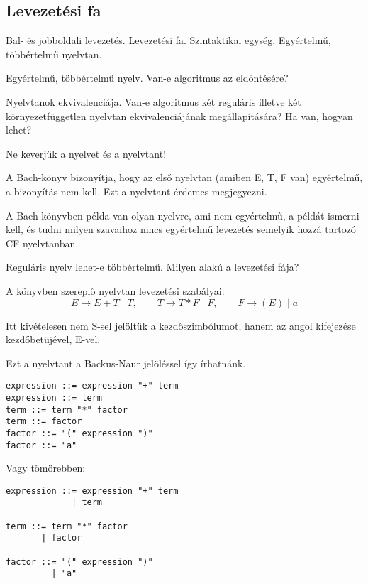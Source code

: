 \documentclass[a4paper]{article}
\begin{document}
\subsection{Levezetési fa}

Bal- és jobboldali levezetés.
Levezetési fa. Szintaktikai egység.
Egyértelmű, többértelmű nyelvtan.

Egyértelmű, többértelmű nyelv. Van-e algoritmus az eldöntésére?

Nyelvtanok ekvivalenciája.
Van-e algoritmus két reguláris illetve két környezetfüggetlen nyelvtan
ekvivalenciájának megállapítására? Ha van, hogyan lehet?

Ne keverjük a nyelvet és a nyelvtant!

A Bach-könyv bizonyítja, hogy az első nyelvtan (amiben E, T, F van)
egyértelmű, a bizonyítás nem kell. Ezt a nyelvtant érdemes megjegyezni.

A Bach-könyvben példa van olyan nyelvre, ami nem egyértelmű, a példát
ismerni kell, és tudni milyen szavaihoz nincs egyértelmű levezetés
semelyik hozzá tartozó CF nyelvtanban.

Reguláris nyelv lehet-e többértelmű. Milyen alakú a levezetési fája?

A könyvben szereplő nyelvtan levezetési szabályai:
\begin{equation}
    E \rightarrow E+T \mid T,\qquad T \rightarrow T*F \mid F,
    \qquad F \rightarrow (E) \mid a
    \label{eq:expr_rules}
\end{equation}

Itt kivételesen nem S-sel jelöltük a kezdőszimbólumot, hanem az angol
kifejezése kezdőbetüjével, E-vel.

Ezt a nyelvtant a Backus-Naur jelöléssel így írhatnánk.

\vspace{1ex}
\begin{verbatim}
expression ::= expression "+" term
expression ::= term
term ::= term "*" factor
term ::= factor
factor ::= "(" expression ")"
factor ::= "a"
\end{verbatim}
\vspace{1ex}

Vagy tömörebben:

\vspace{1ex}
\begin{verbatim}
expression ::= expression "+" term
             | term

term ::= term "*" factor
       | factor

factor ::= "(" expression ")"
         | "a"
\end{verbatim}
\vspace{1ex}
\end{document}
